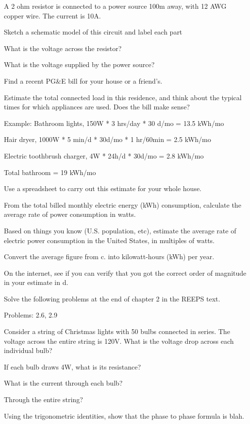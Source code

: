 \documentclass{article}
\begin{document}
A 2 ohm resistor is connected to a power source 100m away, with 12 AWG copper
wire. The current is 10A.

\subproblem
Sketch a schematic model of this circuit and label each part

\subproblem
What is the voltage across the resistor?

\subproblem
What is the voltage supplied by the power source?


Find a recent PG\&E bill for your house or a friend's.

\subproblem
Estimate the total connected load in this residence, and think
about the typical times for which appliances are used.  Does the
bill make sense?

Example: Bathroom lights, 150W * 3 hrs/day * 30 d/mo = 13.5 kWh/mo

Hair dryer, 1000W * 5 min/d * 30d/mo * 1 hr/60min = 2.5 kWh/mo

Electric toothbrush charger, 4W * 24h/d * 30d/mo = 2.8 kWh/mo

Total bathroom = 19 kWh/mo

Use a spreadsheet to carry out this estimate for your whole house.

\subproblem
From the total billed monthly electric energy (kWh) consumption,
calculate the average rate of power consumption in watts.

\subproblem
Based on things you know (U.S. population, etc), estimate the
average rate of electric power consumption in the United States, in
multiples of watts.

\subproblem
Convert the average figure from c. into kilowatt-hours (kWh) per year.

\subproblem
On the internet, see if you can verify that you got the correct
order of magnitude in your estimate in d.



Solve the following problems at the end of chapter 2 in the REEPS text.

Problems:  2.6, 2.9


\subproblem
Consider a string of Christmas lights with 50 bulbs connected in series.
The voltage across the entire string is 120V.  What is the voltage drop across
each individual bulb?

\subproblem
If each bulb draws 4W, what is its resistance?

\subproblem
What is the current through each bulb?

\subproblem
Through the entire string?

Using the trigonometric identities, show that the phase to phase formula
is blah.

\end{document}
